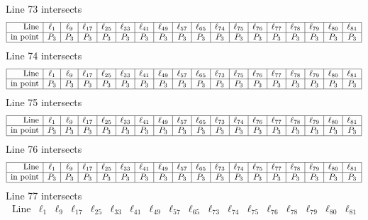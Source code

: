 \documentclass{article}
\begin{document}
{$$$$
Line 73 intersects 
$$
\begin{array}{|r*{17}{|c}|}
\hline
\mbox{Line}  & \ell_{1} & \ell_{9} & \ell_{17} & \ell_{25} & \ell_{33} & \ell_{41} & \ell_{49} & \ell_{57} & \ell_{65} & \ell_{74} & \ell_{75} & \ell_{76} & \ell_{77} & \ell_{78} & \ell_{79} & \ell_{80} & \ell_{81}\\
\hline
\mbox{in point}  & P_{3} & P_{3} & P_{3} & P_{3} & P_{3} & P_{3} & P_{3} & P_{3} & P_{3} & P_{3} & P_{3} & P_{3} & P_{3} & P_{3} & P_{3} & P_{3} & P_{3}\\
\hline
\end{array}
$$
Line 74 intersects 
$$
\begin{array}{|r*{17}{|c}|}
\hline
\mbox{Line}  & \ell_{1} & \ell_{9} & \ell_{17} & \ell_{25} & \ell_{33} & \ell_{41} & \ell_{49} & \ell_{57} & \ell_{65} & \ell_{73} & \ell_{75} & \ell_{76} & \ell_{77} & \ell_{78} & \ell_{79} & \ell_{80} & \ell_{81}\\
\hline
\mbox{in point}  & P_{3} & P_{3} & P_{3} & P_{3} & P_{3} & P_{3} & P_{3} & P_{3} & P_{3} & P_{3} & P_{3} & P_{3} & P_{3} & P_{3} & P_{3} & P_{3} & P_{3}\\
\hline
\end{array}
$$
Line 75 intersects 
$$
\begin{array}{|r*{17}{|c}|}
\hline
\mbox{Line}  & \ell_{1} & \ell_{9} & \ell_{17} & \ell_{25} & \ell_{33} & \ell_{41} & \ell_{49} & \ell_{57} & \ell_{65} & \ell_{73} & \ell_{74} & \ell_{76} & \ell_{77} & \ell_{78} & \ell_{79} & \ell_{80} & \ell_{81}\\
\hline
\mbox{in point}  & P_{3} & P_{3} & P_{3} & P_{3} & P_{3} & P_{3} & P_{3} & P_{3} & P_{3} & P_{3} & P_{3} & P_{3} & P_{3} & P_{3} & P_{3} & P_{3} & P_{3}\\
\hline
\end{array}
$$
Line 76 intersects 
$$
\begin{array}{|r*{17}{|c}|}
\hline
\mbox{Line}  & \ell_{1} & \ell_{9} & \ell_{17} & \ell_{25} & \ell_{33} & \ell_{41} & \ell_{49} & \ell_{57} & \ell_{65} & \ell_{73} & \ell_{74} & \ell_{75} & \ell_{77} & \ell_{78} & \ell_{79} & \ell_{80} & \ell_{81}\\
\hline
\mbox{in point}  & P_{3} & P_{3} & P_{3} & P_{3} & P_{3} & P_{3} & P_{3} & P_{3} & P_{3} & P_{3} & P_{3} & P_{3} & P_{3} & P_{3} & P_{3} & P_{3} & P_{3}\\
\hline
\end{array}
$$
Line 77 intersects 
$$
\begin{array}{|r*{17}{|c}|}
\hline
\mbox{Line}  & \ell_{1} & \ell_{9} & \ell_{17} & \ell_{25} & \ell_{33} & \ell_{41} & \ell_{49} & \ell_{57} & \ell_{65} & \ell_{73} & \ell_{74} & \ell_{75} & \ell_{76} & \ell_{78} & \ell_{79} & \ell_{80} & \ell_{81}\\

\end{array}$$}
\end{document}
